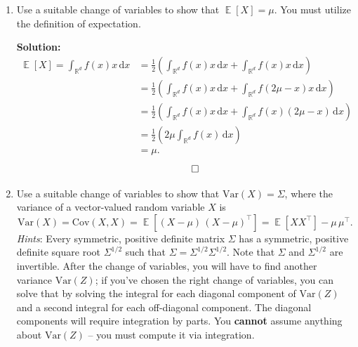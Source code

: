 \documentclass{article}
\DeclareMathOperator{\R}{\mathbb{R}}
\DeclareMathOperator{\E}{\mathbb{E}}
\newenvironment{solution}{\color{blue} \smallskip \textbf{Solution:}}{}
\begin{document}
\begin{enumerate}

    \item
    Use a suitable change of variables to show that $\E[X] = \mu$. 
    You must utilize the definition of expectation.

    \begin{solution}
        \begin{align*}
        \E[X] = \int_{\R^d} f(x)x\,\mathrm dx &= \frac{1}{2} (\int_{\R^d} f(x)x\,\mathrm dx + \int_{\R^d} f(x)x\,\mathrm dx) \\ 
        &= \frac{1}{2} (\int_{\R^d} f(x)x\,\mathrm dx + \int_{\R^d} f(2\mu - x)x\,\mathrm dx) \\ 
        &= \frac{1}{2} (\int_{\R^d} f(x)x\,\mathrm dx + \int_{\R^d} f(x)(2\mu - x)\,\mathrm dx) \\
        &= \frac{1}{2} (2 \mu \int_{\R^d} f(x)\,\mathrm dx) \\
        &= \mu.
        \end{align*}
        \[ \qedhere \]
    \end{solution}

    \item
    Use a suitable change of variables to show that $\mathrm{Var}(X) = \Sigma$, where the variance of a vector-valued random variable $X$ is
    \[
        \mathrm{Var}(X) = \mathrm{Cov}(X, X) = \E[(X - \mu) \, (X - \mu)^\top] = \E[XX^\top] - \mu \, \mu^\top.
    \]
    \emph{Hints}: Every symmetric, positive  definite matrix $\Sigma$ has a symmetric, positive definite square root $\Sigma^{1/2}$ such that $\Sigma = \Sigma^{1/2} \Sigma^{1/2}$.
    Note that $\Sigma$ and $\Sigma^{1/2}$ are invertible.
    After the change of variables, you will have to find another variance $\mathrm{Var}(Z)$; if you've chosen the right change of variables, you can solve that by solving the integral for each diagonal component of $\mathrm{Var}(Z)$ and a second integral for each off-diagonal component.
    The diagonal components will require integration by parts.
    You \textbf{cannot} assume anything about $\mathrm{Var}(Z)$ -- you must compute it via integration.


\end{enumerate}
\end{document}

